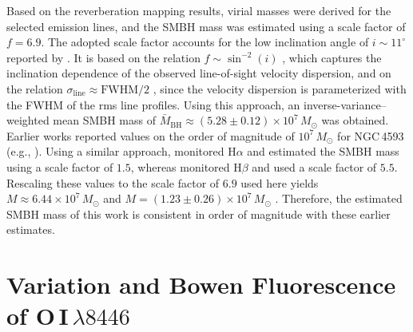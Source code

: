 Based on the reverberation mapping results, virial masses were derived for the selected emission lines, and the SMBH mass was estimated using a scale factor of $f=6.9$. The adopted scale factor accounts for the low inclination angle of $i \sim 11^\circ$ reported by \cite{Ochmann_2025}. It is based on the relation $f \sim \sin^{-2}(i)$ \parencite{krolik2001systematic}, which captures the inclination dependence of the observed line-of-sight velocity dispersion, and on the relation $\sigma_{\mathrm{line}} \approx \mathrm{FWHM}/2$ \parencite{peterson2004}, since the velocity dispersion is parameterized with the FWHM of the rms line profiles. Using this approach, an inverse-variance–weighted mean SMBH mass of $\bar{M}_{\mathrm{BH}} \approx (5.28 \pm 0.12)\times 10^{7}\,M_\odot$ was obtained. Earlier works reported values on the order of magnitude of $10^7\,M_\odot$ for NGC\,4593 (e.g., \cite{kollatschny1997balmer, denney2006ngc4593}). Using a similar approach, \cite{kollatschny1997balmer} monitored H$\alpha$ and estimated the SMBH mass using a scale factor of $1.5$, whereas \cite{denney2006ngc4593} monitored H$\beta$ and used a scale factor of $5.5$. Rescaling these values to the scale factor of $6.9$ used here yields $M \approx 6.44 \times 10^7\,M_\odot$ \parencite{kollatschny1997balmer} and $M = (1.23 \pm 0.26) \times 10^7\,M_\odot$ \parencite{denney2006ngc4593}. Therefore, the estimated SMBH mass of this work is consistent in order of magnitude with these earlier estimates.

\section{Variation and Bowen Fluorescence of O\,\textsc{I}$\,\lambda8446$}
\label{sec:discussion_BF}

